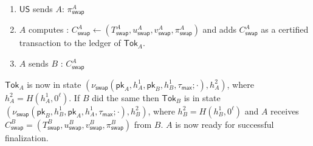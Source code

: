 \documentclass{article}
\newcommand{\pubkey}[0]{\mathsf{pk}}
\newcommand{\unisrv}[0]{\mathsf{US}}
\newcommand{\sthash}[0]{h_\mathsf{st}}
\newcommand{\txhash}[0]{h_\mathsf{tx}}
\begin{document}
\begin{enumerate}
    \item $\unisrv$ sends $A$: $\pi^A_\mathsf{swap}$
    \item $A$ computes : $C^A_\mathsf{swap}\gets (T^A_\mathsf{swap},u^A_\mathsf{swap},v^A_\mathsf{swap},\pi^A_\mathsf{swap})$ and adds $C^A_\mathsf{swap}$ as a certified transaction to the ledger of $\mathsf{Tok}_A$.
    \item $A$ sends $B$ : $C^A_\mathsf{swap}$
\end{enumerate}
$\mathsf{Tok}_A$ is now in state $(\nu_\mathsf{swap}(\pubkey_A,h^1_A,\pubkey_B,h^1_B,\tau_\mathsf{max};\cdot),h^2_A)$, where $h^2_A=H(h^1_A,0^\ell)$. If $B$ did the same then
$\mathsf{Tok}_B$ is in state $(\nu_\mathsf{swap}(\pubkey_B,h^1_B,\pubkey_A,h^1_A,\tau_\mathsf{max};\cdot),h^2_B)$, where $h^2_B=H(h^1_B,0^\ell)$
and $A$ receives $C^B_\mathsf{swap}=(T^B_\mathsf{swap},u^B_\mathsf{swap},v^B_\mathsf{swap},\pi^B_\mathsf{swap})$ from $B$. $A$ is now ready for successful finalization.\medskip
\end{document}

